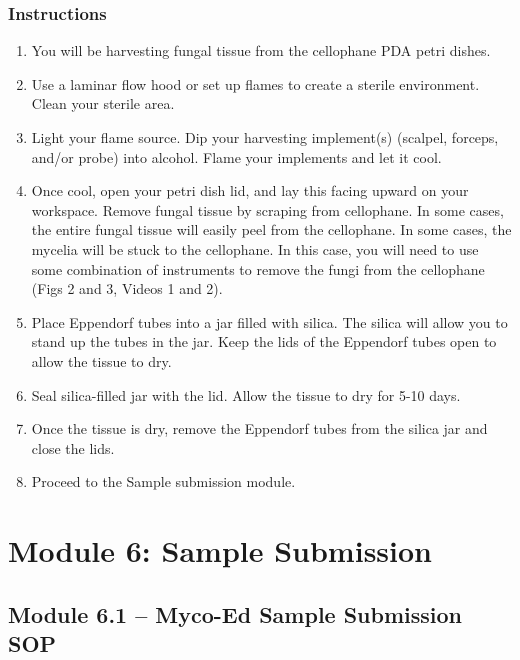 \documentclass[
  letterpaper,
  DIV=11,
  numbers=noendperiod]{scrreprt}
\providecommand{\tightlist}{%
  \setlength{\itemsep}{0pt}\setlength{\parskip}{0pt}}
\begin{document}
\subsection*{Instructions}\label{instructions-2}

\begin{enumerate}
\def\labelenumi{\arabic{enumi}.}
\tightlist
\item
  You will be harvesting fungal tissue from the cellophane PDA petri
  dishes.
\item
  Use a laminar flow hood or set up flames to create a sterile
  environment. Clean your sterile area.
\item
  Light your flame source. Dip your harvesting implement(s) (scalpel,
  forceps, and/or probe) into alcohol. Flame your implements and let it
  cool.
\item
  Once cool, open your petri dish lid, and lay this facing upward on
  your workspace. Remove fungal tissue by scraping from cellophane. In
  some cases, the entire fungal tissue will easily peel from the
  cellophane. In some cases, the mycelia will be stuck to the
  cellophane. In this case, you will need to use some combination of
  instruments to remove the fungi from the cellophane (Figs 2 and 3,
  Videos 1 and 2).
\item
  Place Eppendorf tubes into a jar filled with silica. The silica will
  allow you to stand up the tubes in the jar. Keep the lids of the
  Eppendorf tubes open to allow the tissue to dry.
\item
  Seal silica-filled jar with the lid. Allow the tissue to dry for 5-10
  days.
\item
  Once the tissue is dry, remove the Eppendorf tubes from the silica jar
  and close the lids.
\item
  Proceed to the Sample submission module.
\end{enumerate}


\chapter*{Module 6: Sample Submission}\label{module-6-sample-submission}


\section*{Module 6.1 -- Myco-Ed Sample Submission
SOP}\label{module-6.1-myco-ed-sample-submission-sop}
\end{document}
